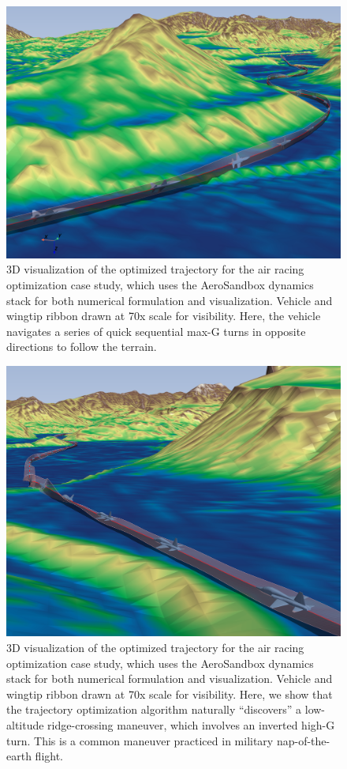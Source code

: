 \begin{figure}[h]
    \centering
    \includegraphics[width=\textwidth]{../figures/air-racing/2.png}
    \caption{3D visualization of the optimized trajectory for the air racing optimization case study, which uses the AeroSandbox dynamics stack for both numerical formulation and visualization. Vehicle and wingtip ribbon drawn at 70x scale for visibility. Here, the vehicle navigates a series of quick sequential max-G turns in opposite directions to follow the terrain.}
    \label{fig:air-racing-2}
\end{figure}

\begin{figure}[h]
    \centering
    \includegraphics[width=\textwidth]{../figures/air-racing/3.png}
    \caption{3D visualization of the optimized trajectory for the air racing optimization case study, which uses the AeroSandbox dynamics stack for both numerical formulation and visualization. Vehicle and wingtip ribbon drawn at 70x scale for visibility. Here, we show that the trajectory optimization algorithm naturally ``discovers'' a low-altitude ridge-crossing maneuver, which involves an inverted high-G turn. This is a common maneuver practiced in military nap-of-the-earth flight.}
    \label{fig:air-racing-3}
\end{figure}

